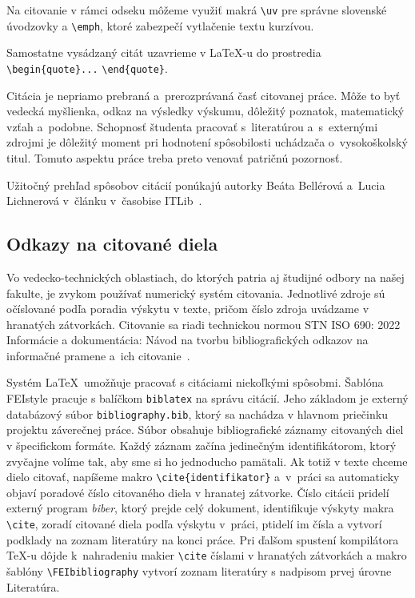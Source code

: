 Na citovanie v rámci odseku môžeme využiť makrá \verb|\uv| pre
správne slovenské úvodzovky a \verb|\emph|,
ktoré zabezpečí vytlačenie textu kurzívou.

Samostatne vysádzaný citát uzavrieme v \LaTeX-u do prostredia
\verb|\begin{quote}...| \verb|\end{quote}|.

Citácia je nepriamo prebraná a~prerozprávaná
časť citovanej práce.
Môže to byť vedecká myšlienka, odkaz na výsledky výskumu, 
dôležitý poznatok, matematický vzťah a~podobne.
Schopnosť študenta pracovať s~literatúrou a~s~externými zdrojmi 
je dôležitý moment pri hodnotení spôsobilosti uchádzača
o~vysokoškolský titul.
Tomuto aspektu práce treba preto venovať patričnú pozornosť.

Užitočný prehľad spôsobov citácií ponúkajú autorky
Beáta Bellérová a~Lucia Lichnerová v~článku v~časobise ITLib~\cite{Lichnerova2023Nove}.

\subsection{Odkazy na citované diela}
Vo vedecko-technických oblastiach, do ktorých patria aj študijné odbory na našej fakulte, je zvykom používať numerický systém citovania. Jednotlivé zdroje sú očíslované podľa poradia výskytu v texte, pričom číslo zdroja uvádzame v hranatých zátvorkách.
Citovanie sa riadi technickou normou STN ISO 690: 2022 Informácie a dokumentácia: Návod na tvorbu bibliografických odkazov na informačné pramene a~ich citovanie~\cite{iso690}.

Systém \LaTeX\ umožňuje pracovať s citáciami niekoľkými spôsobmi.
Šablóna FEIstyle pracuje s balíčkom \verb|biblatex| na správu citácií. Jeho základom je externý databázový súbor \texttt{bibliography.bib},
ktorý sa nachádza v hlavnom priečinku projektu záverečnej práce.
Súbor obsahuje bibliografické záznamy citovaných diel
v špecifickom formáte.
Každý záznam začína jedinečným identifikátorom, ktorý zvyčajne
volíme tak, aby sme si ho jednoducho pamätali. 
Ak totiž v texte chceme dielo citovať, napíšeme makro \verb|\cite{identifikator}| a~v~práci sa automaticky objaví poradové číslo citovaného diela v hranatej zátvorke.
Číslo citácii pridelí externý program \textsl{biber},
ktorý prejde celý dokument, identifikuje výskyty makra \verb|\cite|, zoradí citované diela podľa výskytu v~práci,
ptidelí im čísla a vytvorí podklady na zoznam literatúry na konci práce.
Pri ďalšom spustení kompilátora \TeX-u dôjde k~nahradeniu makier 
\verb|\cite| číslami v hranatých zátvorkách a makro šablóny 
\verb|\FEIbibliography| vytvorí zoznam literatúry s nadpisom 
prvej úrovne Literatúra.

